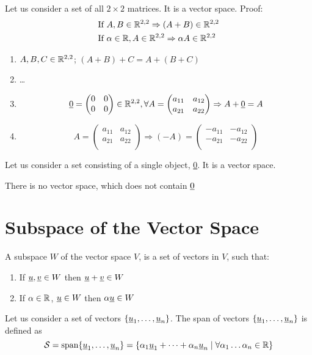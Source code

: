 \begin{example}
Let us consider a set of all $2\times 2$ matrices. It is a vector space. Proof:
\begin{align*}
&\text{If }A,B\in\mathbb{R}^{2,2}\Rightarrow (A+B)\in\mathbb{R}^{2,2}\\
&\text{If }\alpha\in\mathbb{R}, A\in\mathbb{R}^{2,2}\Rightarrow\alpha A \in \mathbb{R}^{2,2}
\end{align*}

\begin{enumerate}
\item $A,B,C\in\mathbb{R}^{2,2}$; $(A+B)+C = A+(B+C)$
\item \dots 
\item \[
\underline{0} = \begin{pmatrix}
0 & 0\\
0 & 0
\end{pmatrix}\in \mathbb{R}^{2,2}, \forall A = \begin{pmatrix}
a_{11} & a_{12}\\
a_{21} & a_{22}\\
\end{pmatrix} \Rightarrow A+\underline{0} = A
\]
\item \[
A = \begin{pmatrix}
a_{11} & a_{12}\\
a_{21} & a_{22}\\
\end{pmatrix}\Rightarrow (-A) = \begin{pmatrix}
-a_{11} & -a_{12}\\
-a_{21} & -a_{22}\\
\end{pmatrix}
\]
\end{enumerate}
\end{example}
\begin{example}
Let us consider a set consisting of a single object, \ul{0}. It is a vector space. 
\end{example}

\begin{note}
There is no vector space, which does not contain $\underline{0}$	
\end{note}


\section{Subspace of the Vector Space}
\begin{definition}
A subspace $W$ of the vector space $V$, is a set of vectors in $V$, such that:
\begin{enumerate}
	\item If $\underline{u},\underline{v}\in W$ then $\underline{u}+\underline{v}\in W$
\item If $\alpha \in\mathbb{R}$, $\underline{u}\in W$ then $\alpha \underline{u}\in W$
\end{enumerate}
\end{definition}
\begin{definition}
Let us consider a set of vectors $\{ \underline{u}_1,\dots,\underline{u}_n \}$. The span of vectors $\{ \underline{u}_1,\dots,\underline{u}_n \}$ is defined as
\[ \mathcal{S} = \text{span}\{\underline{u}_1,\dots,\underline{u}_n\} = \{\alpha_1\underline{u}_1+\dots+\alpha_n\underline{u}_n\mid \forall\alpha_1\dots\alpha_n\in\mathbb{R}\}\]
\end{definition}

